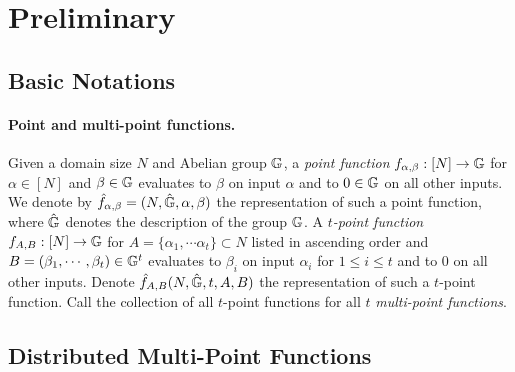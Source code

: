 \section{Preliminary}

\subsection{Basic Notations}



 \paragraph{Point and multi-point functions.} Given a domain size $N$ and Abelian group $\mathbb{G}$, a \emph{point function} $f_{\alpha,\beta}:[N]\rightarrow\mathbb{G}$ for $\alpha\in[N]$ and $\beta\in\mathbb{G}$ evaluates to $\beta$ on input $\alpha$ and to $0\in\mathbb{G}$ on all other inputs. We denote by $\hat{f}_{\alpha,\beta}=(N,\hat{\mathbb{G}},\alpha,\beta)$ the representation of such a point function, where $\hat{\mathbb{G}}$ denotes the description of the group $\mathbb{G}$. A \emph{$t$-point function} $f_{A,B}:[N]\rightarrow \mathbb{G}$ for $A=\{\alpha_1,\cdots\alpha_t\}\subset N$ listed in ascending order and $B=(\beta_1,\cdots,\beta_t)\in \mathbb{G}^t$ evaluates to $\beta_i$ on input $\alpha_i$ for $1\le i\le t$ and to $0$ on all other inputs. Denote $\hat{f}_{A,B}(N,\hat{\mathbb{G}},t,A,B)$ the representation of such a $t$-point function. Call the collection of all $t$-point functions for all $t$ \emph{multi-point functions}. 
 
\subsection{Distributed Multi-Point Functions}

